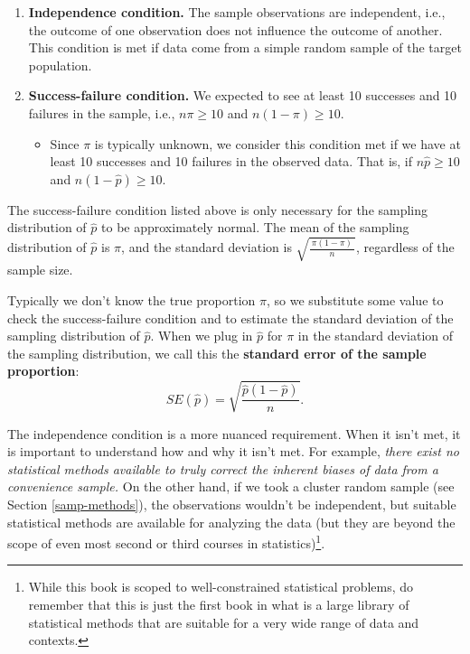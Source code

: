 \documentclass[
  10pt,
  openany]{book}
\providecommand{\tightlist}{%
  \setlength{\itemsep}{0pt}\setlength{\parskip}{0pt}}
\theoremstyle{definition}
\theoremstyle{definition}
\theoremstyle{definition}
\theoremstyle{definition}
\theoremstyle{remark}
\begin{document}
\begin{enumerate}
\def\labelenumi{\arabic{enumi}.}
\item
  \textbf{Independence condition.} The sample observations are independent, i.e., the outcome of one observation does not influence the outcome of another. This condition is met if data come from a simple random sample of the target population.
\item
  \textbf{Success-failure condition.} We expected to see at least 10 successes and 10 failures in the sample, i.e., \(n\pi\geq10\) and \(n(1-\pi)\geq10\).

  \begin{itemize}
  \tightlist
  \item
    Since \(\pi\) is typically unknown, we consider this condition met if we have at least 10 successes and 10 failures in the observed data. That is, if \(n\hat{p} \geq 10\) and \(n(1-\hat{p}) \geq 10\).
  \end{itemize}
\end{enumerate}

The success-failure condition listed above is only necessary for the sampling distribution of \(\hat{p}\) to be approximately normal. The mean of the sampling distribution of \(\hat{p}\) is \(\pi\), and the standard deviation is \(\sqrt{\frac{\ \pi(1-\pi)\ }{n}}\), regardless of the sample size.

Typically we don't know the true proportion \(\pi\), so we substitute some value to check the success-failure condition and to estimate the standard deviation of the sampling distribution of \(\hat{p}\). When we plug in \(\hat{p}\) for \(\pi\) in the standard deviation of the sampling distribution, we call this the \textbf{standard error of the sample proportion}:
\[
SE(\hat{p}) = \sqrt{\frac{\hat{p}(1-\hat{p})}{n}}.
\]

The independence condition is a more nuanced requirement. When it isn't met, it is important to understand how and why it isn't met. For example, \emph{there exist no statistical methods available to truly correct the inherent biases of data from a convenience sample.} On the other hand, if we took a cluster random sample (see Section \ref{samp-methods}), the observations wouldn't be independent, but suitable statistical methods are available for analyzing the data (but they are beyond the scope of even most second or third courses in statistics)\footnote{While this book is scoped to well-constrained statistical problems, do remember that this is just the first book in what is a large library of statistical methods that are suitable for a very wide range of data and contexts.}.
\end{document}
